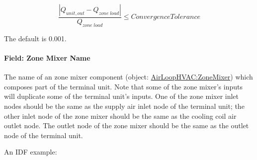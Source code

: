 \begin{equation}
\frac{{\left| {{Q_{unit,out}} - {Q_{zone\;load}}} \right|}}{{{Q_{zone\;load}}}} \le ConvergenceTolerance
\end{equation}

The default is 0.001.

\paragraph{Field: Zone Mixer Name}\label{field-zone-mixer-name-2}

The name of an zone mixer component (object: \hyperref[airloophvaczonemixer]{AirLoopHVAC:ZoneMixer}) which composes part of the terminal unit. Note that some of the zone mixer's inputs will duplicate some of the terminal unit's inputs. One of the zone mixer inlet nodes should be the same as the supply air inlet node of the terminal unit; the other inlet node of the zone mixer should be the same as the cooling coil air outlet node. The outlet node of the zone mixer should be the same as the outlet node of the terminal unit.

An IDF example:

